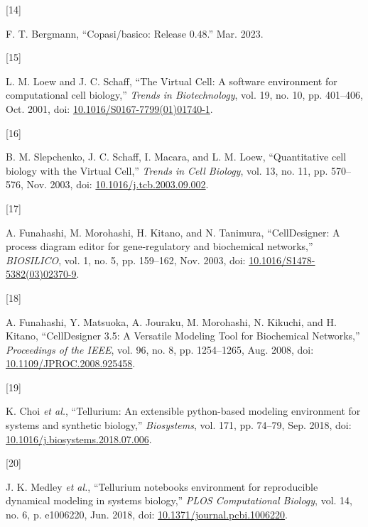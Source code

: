 \documentclass[
]{article}
\newlength{\cslhangindent}
\newlength{\csllabelwidth}
\newlength{\cslentryspacingunit} %
\newenvironment{CSLReferences}[2] %
 {%
  \setlength{\parindent}{0pt}
  \ifodd #1
  \let\oldpar\par
  \def\par{\hangindent=\cslhangindent\oldpar}
  \fi
  \setlength{\parskip}{#2\cslentryspacingunit}
 }%
 {}
\newcommand{\CSLLeftMargin}[1]{\parbox[t]{\csllabelwidth}{#1}}
\newcommand{\CSLRightInline}[1]{\parbox[t]{\linewidth - \csllabelwidth}{#1}\break}
\begin{document}
\begin{CSLReferences}{0}{0}
\leavevmode{}%
\CSLLeftMargin{{[}14{]} }%
\CSLRightInline{F. T. Bergmann, {``Copasi/basico: {Release} 0.48.''}
Mar. 2023.}

\leavevmode{}%
\CSLLeftMargin{{[}15{]} }%
\CSLRightInline{L. M. Loew and J. C. Schaff, {``The {Virtual Cell}: A
software environment for computational cell biology,''} \emph{Trends in
Biotechnology}, vol. 19, no. 10, pp. 401--406, Oct. 2001, doi:
\href{https://doi.org/10.1016/S0167-7799(01)01740-1}{10.1016/S0167-7799(01)01740-1}.}

\leavevmode{}%
\CSLLeftMargin{{[}16{]} }%
\CSLRightInline{B. M. Slepchenko, J. C. Schaff, I. Macara, and L. M.
Loew, {``Quantitative cell biology with the {Virtual Cell},''}
\emph{Trends in Cell Biology}, vol. 13, no. 11, pp. 570--576, Nov. 2003,
doi:
\href{https://doi.org/10.1016/j.tcb.2003.09.002}{10.1016/j.tcb.2003.09.002}.}

\leavevmode{}%
\CSLLeftMargin{{[}17{]} }%
\CSLRightInline{A. Funahashi, M. Morohashi, H. Kitano, and N. Tanimura,
{``{CellDesigner}: A process diagram editor for gene-regulatory and
biochemical networks,''} \emph{BIOSILICO}, vol. 1, no. 5, pp. 159--162,
Nov. 2003, doi:
\href{https://doi.org/10.1016/S1478-5382(03)02370-9}{10.1016/S1478-5382(03)02370-9}.}

\leavevmode{}%
\CSLLeftMargin{{[}18{]} }%
\CSLRightInline{A. Funahashi, Y. Matsuoka, A. Jouraku, M. Morohashi, N.
Kikuchi, and H. Kitano, {``{CellDesigner} 3.5: {A Versatile Modeling
Tool} for {Biochemical Networks},''} \emph{Proceedings of the IEEE},
vol. 96, no. 8, pp. 1254--1265, Aug. 2008, doi:
\href{https://doi.org/10.1109/JPROC.2008.925458}{10.1109/JPROC.2008.925458}.}

\leavevmode{}%
\CSLLeftMargin{{[}19{]} }%
\CSLRightInline{K. Choi \emph{et al.}, {``Tellurium: {An} extensible
python-based modeling environment for systems and synthetic biology,''}
\emph{Biosystems}, vol. 171, pp. 74--79, Sep. 2018, doi:
\href{https://doi.org/10.1016/j.biosystems.2018.07.006}{10.1016/j.biosystems.2018.07.006}.}

\leavevmode{}%
\CSLLeftMargin{{[}20{]} }%
\CSLRightInline{J. K. Medley \emph{et al.}, {``Tellurium
notebooks\textemdash{{An}} environment for reproducible dynamical
modeling in systems biology,''} \emph{PLOS Computational Biology}, vol.
14, no. 6, p. e1006220, Jun. 2018, doi:
\href{https://doi.org/10.1371/journal.pcbi.1006220}{10.1371/journal.pcbi.1006220}.}


\end{CSLReferences}
\end{document}
